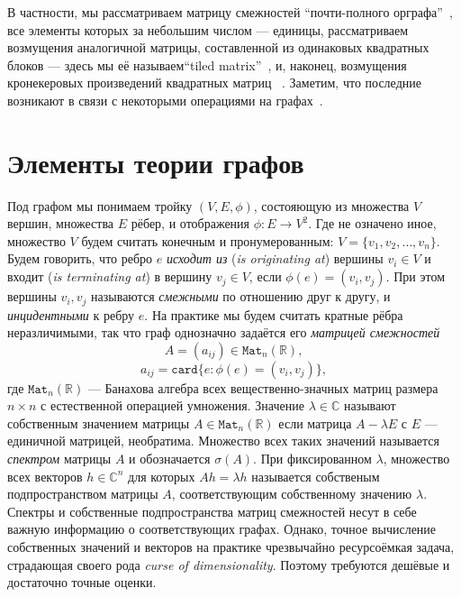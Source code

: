 \documentclass[14pt,a4paper]{extarticle}
\theoremstyle{definition}
\begin{document}
В частности, мы рассматриваем матрицу смежностей
``почти-полного орграфа''~\cite{Koz17,sergekozlukov@vspu},
все элементы которых за небольшим числом --- единицы,
рассматриваем возмущения аналогичной матрицы, составленной из одинаковых
квадратных блоков --- здесь мы её называем``tiled
matrix''~\cite{Koz18,sergekozlukov@currentproblems},
и, наконец, возмущения кронекеровых произведений квадратных матриц
~\cite{Koz18,sergekozlukov@currentproblems,bellman-matrices-kron,XIANG2005210}.
Заметим, что последние возникают в связи с некоторыми операциями на графах~\cite{cvetkovic1997eigenspaces}.

\section{Элементы теории графов}
Под графом мы понимаем тройку \((V, E, \phi)\), состояющую
из множества \( V \) вершин, множества \( E \) рёбер,
и отображения \( \phi: E\to V^2\). Где не означено иное,
множество \( V \) будем считать конечным и пронумерованным: \( V = \{ v_1, v_2,
\ldots, v_n \}\). 
Будем говорить, что ребро \( e \) \emph{исходит из} (\emph{is originating at})
вершины \( v_i\in V \)
и входит (\emph{is terminating at}) в вершину \( v_j\in V \),
если \( \phi(e)=(v_i, v_j)\). При этом вершины \( v_i, v_j \) называются
\emph{смежными} по отношению друг к другу, и \emph{инцидентными} к ребру \( e \).
На практике мы будем считать кратные рёбра неразличимыми,
так что граф однозначно задаётся его \emph{матрицей смежностей}
\[ A = ( a_{ij} ) \in \mathtt{Mat}_n(\mathbb{R}), \]
\[ a_{ij} = \mathtt{card}\{ e: \phi(e)=(v_i, v_j)\}, \]
где \( \mathtt{Mat}_n(\mathbb{R}) \) --- Банахова алгебра всех
вещественно-значных матриц размера
\( n{\times}n \) с естественной операцией умножения.
Значение \( \lambda \in \mathbb{C} \) называют собственным значением
матрицы \(
A\in\mathtt{Mat}_n(\mathbb{R}) \) если матрица \( A - \lambda E \) с \( E \) --- единичной
матрицей, необратима. Множество всех таких значений называется
\emph{спектром} матрицы \( A \) и обозначается \( \sigma(A) \).
При фиксированном \( \lambda \),  множество всех векторов \( h\in\mathbb{C}^n \)
для которых \( A h = \lambda h \) называется собственым подпространством матрицы
\( A \), соответствующим собственному значению \( \lambda \).
Спектры и собственные подпространства матриц смежностей несут в себе важную
информацию о соответствующих графах. Однако, точное вычисление собственных
значений и век\-торов на практике чрезвычайно ресурсо\-ёмкая задача, страдающая
своего рода \emph{curse of dimensionality}. Поэтому требуются дешёвые и
дос\-таточно точные оценки.
\end{document}
